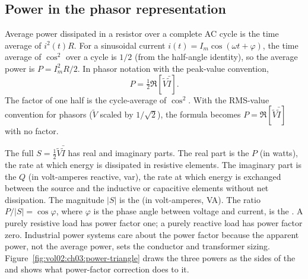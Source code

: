 \subsection{Power in the phasor representation}

Average power dissipated in a resistor over a complete AC cycle is
the time average of $i^{2}(t) R$. For a sinusoidal current
$i(t) = I_{m}\cos(\omega t + \varphi)$, the time average of
$\cos^{2}$ over a cycle is $1/2$ (from the half-angle identity),
so the average power is $P = I_{m}^{2} R / 2$. In phasor
notation with the peak-value convention,
\[
P = \tfrac{1}{2}\Re\left[\tilde{V}\bar{\tilde{I}}\right].
\]
The factor of one half is the cycle-average of $\cos^{2}$. With
the RMS-value convention for phasors ($\tilde{V}$ scaled by
$1/\sqrt{2}$), the formula becomes $P = \Re[\tilde{V}\bar{\tilde{I}}]$
with no factor.

The full  $S = \tfrac{1}{2}\tilde{V}\bar{\tilde{I}}$
has real and imaginary parts. The real part is the
 $P$ (in watts), the rate at which
energy is dissipated in resistive elements. The imaginary part is
the  $Q$ (in volt-amperes reactive, var),
the rate at which energy is exchanged between the source and the
inductive or capacitive elements without net dissipation. The
magnitude $|S|$ is the  (in volt-amperes,
VA). The ratio $P/|S| = \cos\varphi$, where $\varphi$ is the
phase angle between voltage and current, is the
. A purely resistive load has power factor
one; a purely reactive load has power factor zero. Industrial
power systems care about the power factor because the apparent
power, not the average power, sets the conductor and transformer
sizing. Figure~\ref{fig:vol02:ch03:power-triangle} draws the three
powers as the sides of the  and shows what
power-factor correction does to it.



